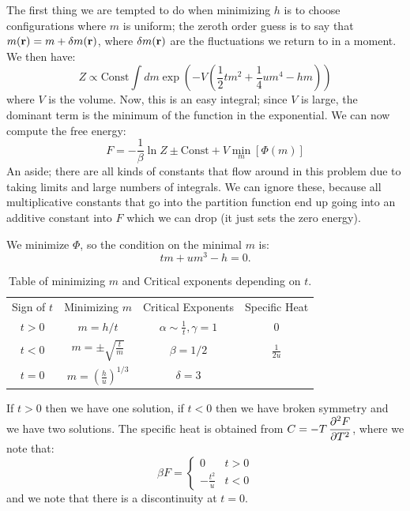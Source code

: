 The first thing we are tempted to do when minimizing $h$ is to choose configurations where $m$ is uniform; the zeroth order guess is to say that $m(\mathbf{r}) = m + \delta m(\mathbf{r})$, where $\delta m(\mathbf{r})$ are the fluctuations we return to in a moment. We then have:
\begin{equation}
    Z \propto \text{Const} \int dm \exp(-V(\frac{1}{2}tm^2 + \frac{1}{4}um^4 - hm))
\end{equation}
where $V$ is the volume. Now, this is an easy integral; since $V$ is large, the dominant term is the minimum of the function in the exponential. We can now compute the free energy:
\begin{equation}
    F = -\frac{1}{\beta}\ln Z \pm \text{Const} + V\min_m[\Phi(m)]
\end{equation}
An aside; there are all kinds of constants that flow around in this problem due to taking limits and large numbers of integrals. We can ignore these, because all multiplicative constants that go into the partition function end up going into an additive constant into $F$ which we can drop (it just sets the zero energy). 

We minimize $\Phi$, so the condition on the minimal $m$ is:
\begin{equation}
    tm + um^3 - h = 0.
\end{equation}

\begin{table}[htbp]
    \centering
    \begin{tabular}{|c|c|c|c|}
        Sign of $t$ & Minimizing $m$ & Critical Exponents & Specific Heat
        \\ $t > 0$ & $m = h/t$ & $\alpha \sim \frac{1}{t}, \gamma = 1$ & 0
        \\ $t < 0$ & $m = \pm \sqrt{\frac{t}{m}}$ & $\beta = 1/2$ & $\frac{1}{2u}$
        \\ $t = 0$ & $m = \left(\frac{h}{u}\right)^{1/3}$ & $\delta = 3$ &
    \end{tabular}
    \caption{Table of minimizing $m$ and Critical exponents depending on $t$.}
    \label{tab:phi4behaviour}
\end{table}

If $t > 0$ then we have one solution, if $t < 0$ then we have broken symmetry and we have two solutions. The specific heat is obtained from $C = -T\dpd[2]{F}{T}$, where we note that:
\begin{equation}
    \beta F = \begin{cases}
        0 & t > 0
        \\ -\frac{t^2}{u} & t < 0
    \end{cases}
\end{equation}
and we note that there is a discontinuity at $t = 0$.

